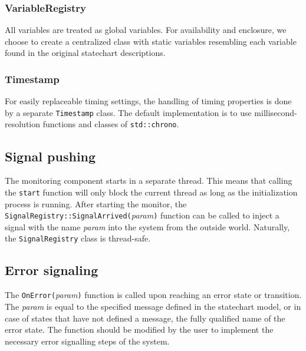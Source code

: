     \subsubsection{VariableRegistry}
All variables are treated as global variables. For availability and enclosure, we choose to create a centralized class with static variables resembling each variable found in the original statechart descriptions.
    \subsubsection{Timestamp}
For easily replaceable timing settings, the handling of timing properties is done by a separate \verb!Timestamp! class. The default implementation is to use millisecond-resolution functions and classes of \verb!std::chrono!.
  \subsection{Signal pushing}
The monitoring component starts in a separate thread. This means that calling the \verb!start! function will only block the current thread as long as the initialization process is running. After starting the monitor, the \verb!SignalRegistry::SignalArrived(!\textit{param}\verb!)! function can be called to inject a signal with the name \textit{param} into the system from the outside world. Naturally, the \verb!SignalRegistry! class is thread-safe.
  \subsection{Error signaling}
The \verb!OnError(!\textit{param}\verb!)! function is called upon reaching an error state or transition. The \textit{param} is equal to the specified message defined in the statechart model, or in case of states that have not defined a message, the fully qualified name of the error state. The function should be modified by the user to implement the necessary error signalling steps of the system.
